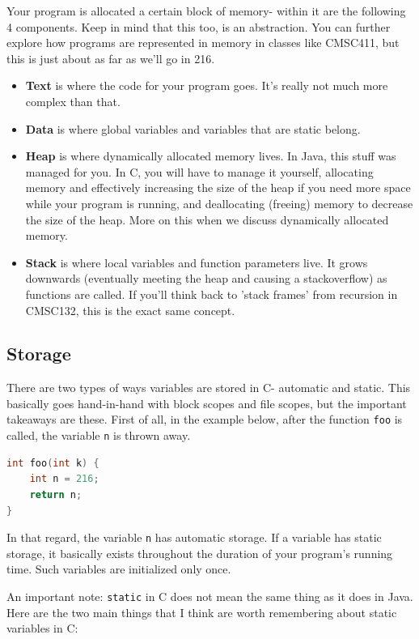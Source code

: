 \documentclass[english, 10pt]{article}
\begin{document}
Your program is allocated a certain block of memory- within it are the following 4 components. Keep in mind that this too, is an abstraction. You can further explore how programs are represented in memory in classes like CMSC411, but this is just about as far as we'll go in 216.

\begin{itemize}
	\item \textbf{Text} is where the code for your program goes. It's really not much more complex than that.
	\item \textbf{Data} is where global variables and variables that are static belong.
	\item \textbf{Heap} is where dynamically allocated memory lives. In Java, this stuff was managed for you. In C, you will have to manage it yourself, allocating memory and effectively increasing the size of the heap if you need more space while your program is running, and deallocating (freeing) memory to decrease the size of the heap. More on this when we discuss dynamically allocated memory.
	\item \textbf{Stack} is where local variables and function parameters live. It grows downwards (eventually meeting the heap and causing a stackoverflow) as functions are called. If you'll think back to 'stack frames' from recursion in CMSC132, this is the exact same concept.
\end{itemize}

\subsection{Storage}

There are two types of ways variables are stored in C- automatic and static. This basically goes hand-in-hand with block scopes and file scopes, but the important takeaways are these. First of all, in the example below, after the function \texttt{foo} is called, the variable \texttt{n} is thrown away.

{\centering
\begin{lstlisting}[language=C]
int foo(int k) {
	int n = 216;
	return n;
}
\end{lstlisting}
}

In that regard, the variable \texttt{n} has automatic storage. If a variable has static storage, it basically exists throughout the duration of your program's running time. Such variables are initialized only once.\newline

An important note: \texttt{static} in C does not mean the same thing as it does in Java. Here are the two main things that I think are worth remembering about static variables in C:
\end{document}
